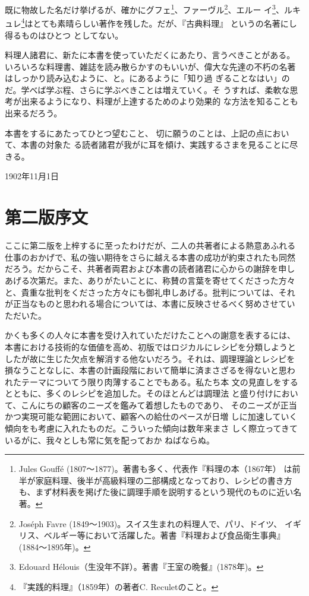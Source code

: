 既に物故した名だけ挙げるが、確かにグフェ\footnote{Jules Gouffé
  (1807〜1877)。著書も多く、代表作『料理の本（1867年）
  は前半が家庭料理、後半が高級料理の二部構成となっており、レシピの書き方
  も、まず材料表を掲げた後に調理手順を説明するという現代のものに近い名著。}、ファーヴル\footnote{Joséph
  Favre (1849〜1903)。スイス生まれの料理人で、パリ、ドイツ、
  イギリス、ベルギー等において活躍した。著書『料理および食品衛生事典』
  (1884〜1895年)。}、エルー イ\footnote{Edouard
  Hélouis（生没年不詳）。著書『王室の晩餐』(1878年)。}、ルキュレ\footnote{『実践的料理』（1859年）の著者C.
  Reculetのこと。}はとても素晴らしい著作を残した。だが、『古典料理』
というの名著にし得るものはひとつ
としてない。

料理人諸君に、新たに本書を使っていただくにあたり、言うべきことがある。
いろいろな料理書、雑誌を読み散らかすのもいいが、偉大な先達の不朽の名著
はしっかり読み込むように、と。にあるように「知り過
ぎることなはい」のだ。学べば学ぶ程、さらに学ぶべきことは増えていく。そ
うすれば、柔軟な思考が出来るようになり、料理が上達するためのより効果的
な方法を知ることも出来るだろう。

本書をするにあたってひとつ望むこと、
切に願うのことは、上記の点において、本書の対象た
る読者諸君が我がに耳を傾け、実践するさまを見ることに尽
きる。


\raggedright 1902年11月1日

\hypertarget{ux7b2cux4e8cux7248ux5e8fux6587}{%
\section{第二版序文}\label{ux7b2cux4e8cux7248ux5e8fux6587}}

\vspace*{1.7\zw}

ここに第二版を上梓するに至ったわけだが、二人の共著者による熱意あふれる
仕事のおかげで、私の強い期待をさらに越える本書の成功が約束されたも同然
だろう。だからこそ、共著者両君および本書の読者諸君に心からの謝辞を申し
あげる次第だ。また、ありがたいことに、称賛の言葉を寄せてくださった方々
と、貴重な批判をくださった方々にも御礼申しあげる。批判については、それ
が正当なものと思われる場合については、本書に反映させるべく努めさせてい
ただいた。

かくも多くの人々に本書を受け入れていただけたことへの謝意を表するには、
本書における技術的な価値を高め、初版ではロジカルにレシピを分類しようと
したが故に生じた欠点を解消する他ないだろう。それは、調理理論とレシピを
損なうことなしに、本書の計画段階において簡単に済まさざるを得ないと思わ
れたテーマについてう限り肉薄することでもある。私たち本
文の見直しをするとともに、多くのレシピを追加した。そのほとんどは調理法
と盛り付けにおいて、こんにちの顧客のニーズを鑑みて着想したものであり、
そのニーズが正当かつ実現可能な範囲において、顧客への給仕のペースが日増
しに加速していく傾向をも考慮に入れたものだ。こういった傾向は数年来まさ
しく際立ってきているがに、我々としも常に気を配っておか
ねばならぬ。

